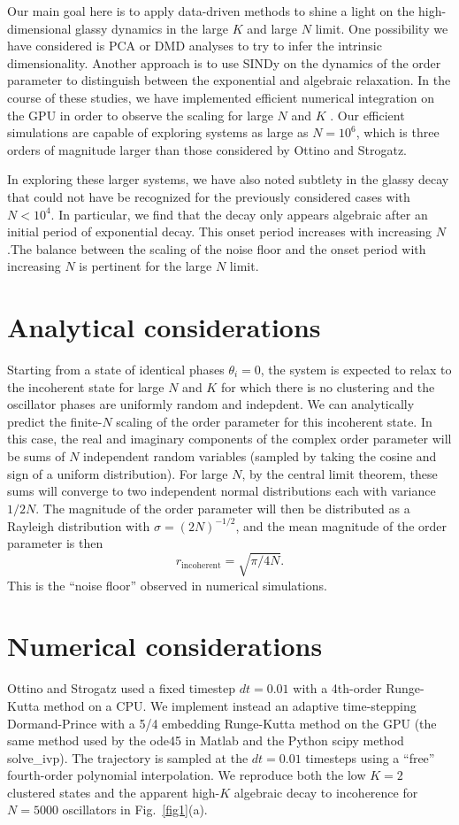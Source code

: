 \documentclass[aps,pre,amsmath,amssymb,floatfix,onecolumn,notitlepage,10pt]{revtex4-1}
\begin{document}
Our main goal here is to apply data-driven methods to shine a light on the high-dimensional glassy dynamics in the large $K$ and large $N$ limit. One possibility we have considered is PCA or DMD analyses to try to infer the intrinsic dimensionality.  Another approach is to use SINDy on the dynamics of the order parameter to distinguish between the exponential and algebraic relaxation.  In the course of these studies, we have implemented efficient numerical integration on the GPU in order to observe the scaling for large $N$ and $K$ \cite{github}. Our efficient simulations are capable of exploring systems as large as $N=10^6$,  which is three orders of magnitude larger than those considered by Ottino and Strogatz. 

In exploring these larger systems, we have also noted subtlety in the glassy decay that could not have be recognized for the previously considered cases with $N<10^4$. In particular, we find that the decay only appears algebraic after an initial period of exponential decay. This onset period increases with increasing $N$.The balance between the scaling of the noise floor and the onset period with increasing $N$ is pertinent for the large $N$ limit.

\section{Analytical considerations}
Starting from a state of identical phases $\theta_i=0$, the system is expected to relax to the incoherent state for large $N$ and $K$ for which there is no clustering and the oscillator phases are uniformly random and indepdent. We can analytically predict the finite-$N$ scaling of the order parameter for this incoherent state. In this case,  the real and imaginary components of the complex order parameter will be sums of $N$ independent random variables (sampled by taking the cosine and sign of a uniform distribution). For large $N$, by the central limit theorem, these sums will converge to two independent normal distributions each with variance $1/2N$. The magnitude of the order parameter will then be distributed as a Rayleigh distribution with $\sigma=(2N)^{-1/2}$, and the mean magnitude of the order parameter is then 
\begin{equation}
r_{\mathrm{incoherent}}=\sqrt{\pi/4N}.  \label{incoherent}
\end{equation}
This is the ``noise floor'' observed in numerical simulations.

\section{Numerical considerations}
Ottino and Strogatz  used a fixed timestep $dt=0.01$ with a 4th-order Runge-Kutta method on a CPU.  We implement instead an adaptive time-stepping Dormand-Prince with a 5/4 embedding Runge-Kutta method on the GPU (the same method used by the ode45 in Matlab and the Python scipy method solve\_ivp).  The trajectory is sampled at the $dt=0.01$ timesteps using a ``free'' fourth-order polynomial interpolation. We reproduce both the low $K=2$ clustered states and the apparent high-$K$ algebraic decay to incoherence for $N=5000$ oscillators in Fig.~\ref{fig1}(a).
\end{document}

